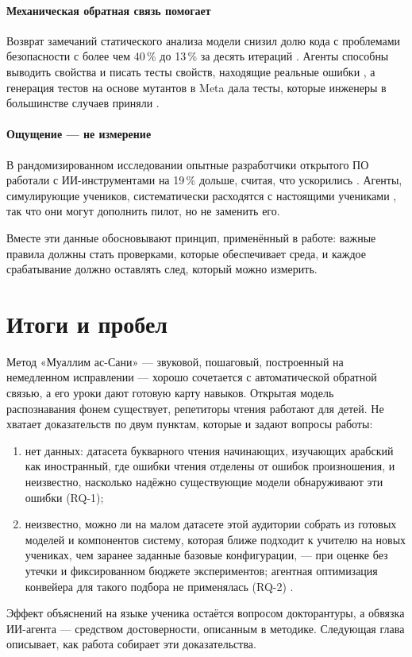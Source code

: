 \paragraph{Механическая обратная связь помогает} Возврат замечаний статического анализа модели снизил долю
кода с проблемами безопасности с более чем 40\,\% до 13\,\% за десять итераций \cite{SRC-078}. Агенты
способны выводить свойства и писать тесты свойств, находящие реальные ошибки \cite{SRC-080,SRC-081}, а
генерация тестов на основе мутантов в Meta дала тесты, которые инженеры в большинстве случаев приняли
\cite{SRC-079}.

\paragraph{Ощущение --- не измерение} В рандомизированном исследовании опытные разработчики открытого ПО
работали с ИИ-инструментами на 19\,\% дольше, считая, что ускорились \cite{SRC-030}. Агенты, симулирующие
учеников, систематически расходятся с настоящими учениками \cite{SRC-083,SRC-084,SRC-085}, так что они
могут дополнить пилот, но не заменить его.

Вместе эти данные обосновывают принцип, применённый в работе: важные правила должны стать проверками,
которые обеспечивает среда, и каждое срабатывание должно оставлять след, который можно измерить.

\section{Итоги и пробел}\label{sec:lr-gap}

Метод «Муаллим ас-Сани» --- звуковой, пошаговый, построенный на немедленном исправлении --- хорошо
сочетается с автоматической обратной связью, а его уроки дают готовую карту навыков. Открытая модель
распознавания фонем существует, репетиторы чтения работают для детей. Не хватает
доказательств по двум пунктам, которые и задают вопросы работы:
\begin{enumerate}
  \item нет данных: датасета букварного чтения начинающих, изучающих арабский как иностранный, где ошибки
    чтения отделены от ошибок произношения, и неизвестно, насколько надёжно существующие модели обнаруживают
    эти ошибки (RQ-1);
  \item неизвестно, можно ли на малом датасете этой аудитории собрать из готовых моделей и компонентов систему,
    которая ближе подходит к учителю на новых учениках, чем заранее заданные базовые конфигурации, --- при оценке без утечки и фиксированном бюджете экспериментов;
    агентная оптимизация конвейера для такого подбора не применялась (RQ-2) .
\end{enumerate}
Эффект объяснений на языке ученика остаётся вопросом докторантуры, а обвязка ИИ-агента --- средством
достоверности, описанным в методике. Следующая глава описывает, как работа собирает эти доказательства.
